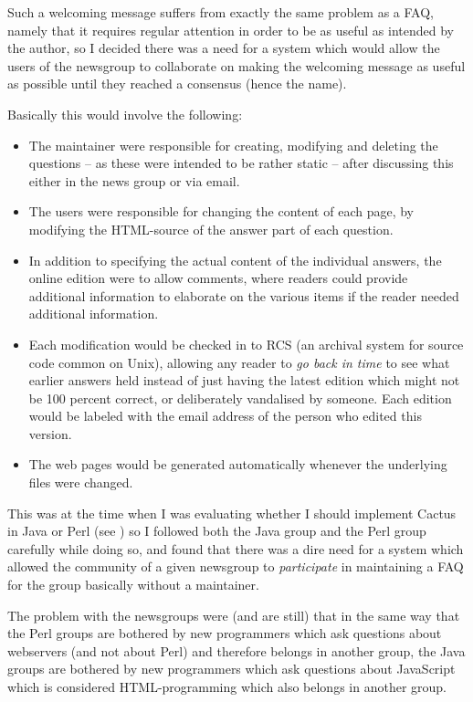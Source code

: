 Such a welcoming message suffers from exactly the same problem as a
FAQ, namely that it requires regular attention in order to be as
useful as intended by the author, so I decided there was a need for a
system which would allow the users of the newsgroup to collaborate on
making the welcoming message as useful as possible until they reached
a consensus (hence the name).

Basically this would involve the following:

\begin{itemize}
\item The maintainer were responsible for creating, modifying and
  deleting the questions -- as these were intended to be rather static
  -- after discussing this either in the news group or via email.
  
\item The users were responsible for changing the content of each
page, by modifying the HTML-source of the answer part of each
question.

\item In addition to specifying the actual content of the individual
  answers, the online edition were to allow comments, where readers
  could provide additional information to elaborate on the various
  items if the reader needed additional information.
  
\item Each modification would be checked in to RCS (an archival system
for source code common on Unix), allowing any reader to \textit{go
back in time} to see what earlier answers held instead of just having
the latest edition which might not be 100 percent correct, or
deliberately vandalised by someone.  Each edition would be labeled
with the email address of the person who edited this version.
  
\item The web pages would be generated automatically whenever the
  underlying files were changed.
  
\end{itemize}

This was at the time when I was evaluating whether I should implement
Cactus in Java or Perl (see ) so I followed both
the Java group and the Perl group carefully while doing so, and found
that there was a dire need for a system which allowed the community of
a given newsgroup to \textit{participate} in maintaining a FAQ for the
group basically without a maintainer.

The problem with the newsgroups were (and are still) that in the same
way that the Perl groups are bothered by new programmers which ask
questions about webservers (and not about Perl) and therefore belongs
in another group, the Java groups are bothered by new programmers
which ask questions about JavaScript which is considered
HTML-programming which also belongs in another group.

